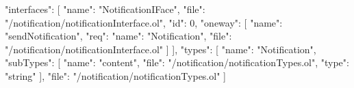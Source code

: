 \begin{jsonlisting}[][caption={Interfaces and types from Jolie represented in JSON}, label={lst:appen_joliejson_typesiface}]
{
  "interfaces": [
    {
      "name": "NotificationIFace",
      "file": "/notification/notificationInterface.ol",
      "id": 0,
      "oneway": [
        {
          "name": "sendNotification",
          "req": {
            "name": "Notification",
            "file": "/notification/notificationInterface.ol"
          }
        }
      ]
    }
  ],
  "types": [
    {
      "name": "Notification",
      "subTypes": [
        {
          "name": "content",
          "file": "/notification/notificationTypes.ol",
          "type": "string"
        }
      ],
      "file": "/notification/notificationTypes.ol"
    }
  ]
}
\end{jsonlisting}
